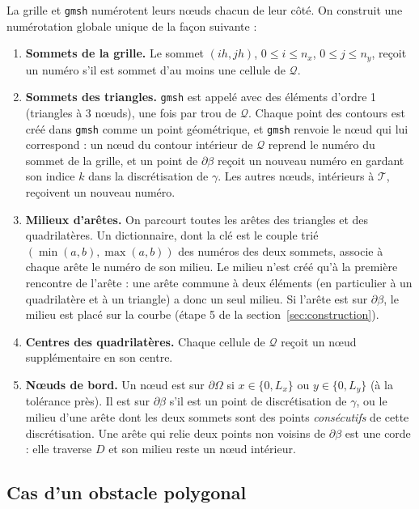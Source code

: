 \documentclass[11pt,a4paper]{article}
\begin{document}
La grille et \texttt{gmsh} numérotent leurs nœuds chacun de leur côté. On
construit une numérotation globale unique de la façon suivante :
\begin{enumerate}
  \item \textbf{Sommets de la grille.} Le sommet $(i h, j h)$,
        $0 \le i \le n_x$, $0 \le j \le n_y$, reçoit un numéro s'il est
        sommet d'au moins une cellule de $\mathcal{Q}$.
  \item \textbf{Sommets des triangles.} \texttt{gmsh} est appelé avec des
        éléments d'ordre 1 (triangles à 3 nœuds), une fois par trou de
        $\mathcal{Q}$. Chaque point des contours est créé dans \texttt{gmsh} comme un point géométrique, et
        \texttt{gmsh} renvoie le nœud qui lui correspond : un nœud du
        contour intérieur de $\mathcal{Q}$ reprend le numéro du sommet de la
        grille, et un point de $\partial\beta$ reçoit un nouveau numéro en
        gardant son indice $k$ dans la discrétisation de $\gamma$. Les
        autres nœuds, intérieurs à $\mathcal{T}$, reçoivent un nouveau
        numéro.
  \item \textbf{Milieux d'arêtes.} On parcourt toutes les arêtes des
        triangles et des quadrilatères. Un dictionnaire, dont la clé est le
        couple trié $(\min(a,b), \max(a,b))$ des numéros des deux sommets,
        associe à chaque arête le numéro de son milieu. Le milieu n'est
        créé qu'à la première rencontre de l'arête : une arête commune à
        deux éléments (en particulier à un quadrilatère et à un triangle)
        a donc un seul milieu. Si l'arête est sur $\partial\beta$, le
        milieu est placé sur la courbe (étape 5 de la section~\ref{sec:construction}).
  \item \textbf{Centres des quadrilatères.} Chaque cellule de $\mathcal{Q}$
        reçoit un nœud supplémentaire en son centre.
  \item \textbf{Nœuds de bord.} Un nœud est sur $\partial\Omega$ si
        $x \in \{0, L_x\}$ ou $y \in \{0, L_y\}$ (à la tolérance près). Il
        est sur $\partial\beta$ s'il est un point de discrétisation de
        $\gamma$, ou le milieu d'une arête dont les deux sommets sont des
        points \emph{consécutifs} de cette discrétisation. Une arête qui
        relie deux points non voisins de $\partial\beta$ est une corde : elle
        traverse $D$ et son milieu reste un nœud intérieur.
\end{enumerate}

\subsection{Cas d'un obstacle polygonal}
\label{sec:polygone}
\end{document}
